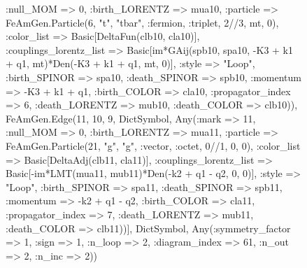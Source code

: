 \documentclass{revtex4}
\begin{document}
\begin{figure}[!htb]
\begin{center}
{:null_MOM => 0, :birth_LORENTZ => mua10, :particle => FeAmGen.Particle(6, "t", "tbar", :fermion, :triplet, 2//3, mt, 0), :color_list => Basic[DeltaFun(clb10, cla10)], :couplings_lorentz_list => Basic[im*GAij(spb10, spa10, -K3 + k1 + q1, mt)*Den(-K3 + k1 + q1, mt, 0)], :style => "Loop", :birth_SPINOR => spa10, :death_SPINOR => spb10, :momentum => -K3 + k1 + q1, :birth_COLOR => cla10, :propagator_index => 6, :death_LORENTZ => mub10, :death_COLOR => clb10)), FeAmGen.Edge(11, 10, 9, Dict{Symbol, Any}(:mark => 11, :null_MOM => 0, :birth_LORENTZ => mua11, :particle => FeAmGen.Particle(21, "g", "g", :vector, :octet, 0//1, 0, 0), :color_list => Basic[DeltaAdj(clb11, cla11)], :couplings_lorentz_list => Basic[-im*LMT(mua11, mub11)*Den(-k2 + q1 - q2, 0, 0)], :style => "Loop", :birth_SPINOR => spa11, :death_SPINOR => spb11, :momentum => -k2 + q1 - q2, :birth_COLOR => cla11, :propagator_index => 7, :death_LORENTZ => mub11, :death_COLOR => clb11))], Dict{Symbol, Any}(:symmetry_factor => 1, :sign => 1, :n_loop => 2, :diagram_index => 61, :n_out => 2, :n_inc => 2)) 
}
\end{center}
\end{figure}
\end{document}
